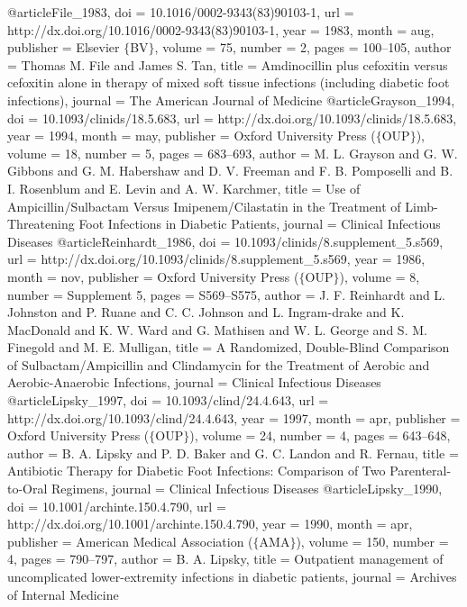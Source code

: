@article{File_1983,
	doi = {10.1016/0002-9343(83)90103-1},
	url = {http://dx.doi.org/10.1016/0002-9343(83)90103-1},
	year = 1983,
	month = {aug},
	publisher = {Elsevier $\lbrace$BV$\rbrace$},
	volume = {75},
	number = {2},
	pages = {100--105},
	author = {Thomas M. File and James S. Tan},
	title = {Amdinocillin plus cefoxitin versus cefoxitin alone in therapy of mixed soft tissue infections (including diabetic foot infections)},
	journal = {The American Journal of Medicine}
}
@article{Grayson_1994,
	doi = {10.1093/clinids/18.5.683},
	url = {http://dx.doi.org/10.1093/clinids/18.5.683},
	year = 1994,
	month = {may},
	publisher = {Oxford University Press ($\lbrace$OUP$\rbrace$)},
	volume = {18},
	number = {5},
	pages = {683--693},
	author = {M. L. Grayson and G. W. Gibbons and G. M. Habershaw and D. V. Freeman and F. B. Pomposelli and B. I. Rosenblum and E. Levin and A. W. Karchmer},
	title = {Use of Ampicillin/Sulbactam Versus Imipenem/Cilastatin in the Treatment of Limb-Threatening Foot Infections in Diabetic Patients},
	journal = {Clinical Infectious Diseases}
}
@article{Reinhardt_1986,
	doi = {10.1093/clinids/8.supplement_5.s569},
	url = {http://dx.doi.org/10.1093/clinids/8.supplement_5.s569},
	year = 1986,
	month = {nov},
	publisher = {Oxford University Press ($\lbrace$OUP$\rbrace$)},
	volume = {8},
	number = {Supplement 5},
	pages = {S569--S575},
	author = {J. F. Reinhardt and L. Johnston and P. Ruane and C. C. Johnson and L. Ingram-drake and K. MacDonald and K. W. Ward and G. Mathisen and W. L. George and S. M. Finegold and M. E. Mulligan},
	title = {A Randomized, Double-Blind Comparison of Sulbactam/Ampicillin and Clindamycin for the Treatment of Aerobic and Aerobic-Anaerobic Infections},
	journal = {Clinical Infectious Diseases}
}
@article{Lipsky_1997,
	doi = {10.1093/clind/24.4.643},
	url = {http://dx.doi.org/10.1093/clind/24.4.643},
	year = 1997,
	month = {apr},
	publisher = {Oxford University Press ($\lbrace$OUP$\rbrace$)},
	volume = {24},
	number = {4},
	pages = {643--648},
	author = {B. A. Lipsky and P. D. Baker and G. C. Landon and R. Fernau},
	title = {Antibiotic Therapy for Diabetic Foot Infections: Comparison of Two Parenteral-to-Oral Regimens},
	journal = {Clinical Infectious Diseases}
}
@article{Lipsky_1990,
	doi = {10.1001/archinte.150.4.790},
	url = {http://dx.doi.org/10.1001/archinte.150.4.790},
	year = 1990,
	month = {apr},
	publisher = {American Medical Association ($\lbrace$AMA$\rbrace$)},
	volume = {150},
	number = {4},
	pages = {790--797},
	author = {B. A. Lipsky},
	title = {Outpatient management of uncomplicated lower-extremity infections in diabetic patients},
	journal = {Archives of Internal Medicine}
}
